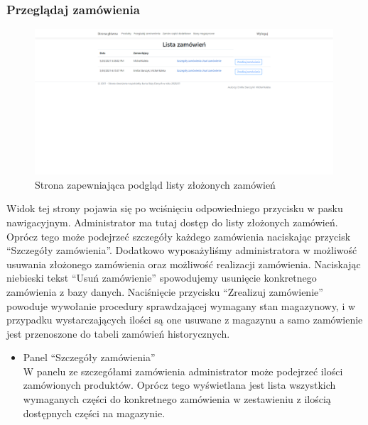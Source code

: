 \documentclass{article}
\begin{document}
\subsubsection{Przeglądaj zamówienia}
\begin{figure}[H]
   \centering
   \includegraphics[width=0.99\textwidth,frame]{Wyglad/lista_zamowien_admin.png}
   \caption{Strona zapewniająca podgląd listy złożonych zamówień}
\end{figure}
Widok tej strony pojawia się po wciśnięciu odpowiedniego przycisku w pasku nawigacyjnym.
Administrator ma tutaj dostęp do listy złożonych zamówień. Oprócz tego może podejrzeć szczegóły
każdego zamówienia naciskając przycisk ``Szczegóły zamówienia''. Dodatkowo wyposażyliśmy
administratora w możliwość usuwania złożonego zamówienia oraz możliwość realizacji zamówienia.
Naciskając niebieski tekst ``Usuń zamówienie'' spowodujemy usunięcie konkretnego zamówienia z bazy
danych. Naciśnięcie przycisku ``Zrealizuj zamówienie'' powoduje wywołanie
procedury sprawdzającej wymagany stan magazynowy, i w przypadku wystarczających
ilości są one usuwane z magazynu a samo zamówienie jest przenoszone do tabeli
zamówień historycznych.

\begin{itemize}
   \item Panel ``Szczegóły zamówienia''\\
         \newline
         W panelu ze szczegółami zamówienia administrator może podejrzeć ilości zamówionych produktów.
         Oprócz tego wyświetlana jest lista wszystkich wymaganych części do konkretnego zamówienia w
         zestawieniu z ilością dostępnych części na magazynie.
\end{itemize}
\end{document}
